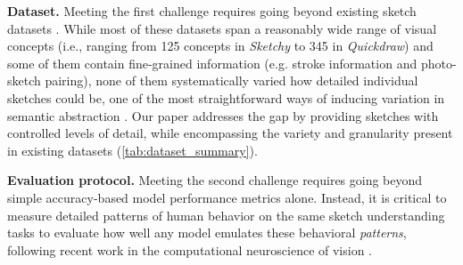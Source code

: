 \documentclass{article}
\begin{document}
\textbf{Dataset.} 
Meeting the first challenge requires going beyond existing sketch datasets \cite{eitz2012humans, sangkloy2016sketchy, jongejan2017quick, dey2019doodle, eitz2012sketch, li2018universal, yu2016sketch, song2017deep, Gao2020SketchyCOCO, wang2019spfusionnet, sarvadevabhatla2017object, li2014comparison, li2014shrec, li2017deeper, peng2019moment, zou2018sketchyscene, liu2020scenesketcher}. 
While most of these datasets span a reasonably wide range of visual concepts (i.e., ranging from 125 concepts in \textit{Sketchy} to 345 in \textit{Quickdraw}) and some of them contain fine-grained information (e.g. stroke information and photo-sketch pairing), none of them systematically varied how detailed individual sketches could be, one of the most straightforward ways of inducing variation in semantic abstraction \cite{berger2013style, fan2020pragmatic, yang2021visual}. 
Our paper addresses the gap by providing sketches with controlled levels of detail, while encompassing the variety and granularity present in existing datasets (\autoref{tab:dataset_summary}).

\textbf{Evaluation protocol.} 
Meeting the second challenge requires going beyond simple accuracy-based model performance metrics alone.
Instead, it is critical to measure detailed patterns of human behavior on the same sketch understanding tasks to evaluate how well any model emulates these behavioral \textit{patterns}, following recent work in the computational neuroscience of vision \cite{rajalingham2018large, bear2021physion, peterson2019human}.

\end{document}
